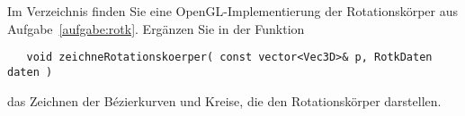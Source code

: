 %
Im Verzeichnis  finden Sie eine 
OpenGL-Implementierung der Rotationskörper 
aus Aufgabe~\ref{aufgabe:rotk}. Ergänzen Sie in der Funktion
\begin{verbatim}
   void zeichneRotationskoerper( const vector<Vec3D>& p, RotkDaten daten )
\end{verbatim}
das Zeichnen der Bézierkurven und Kreise, die den Rotationskörper 
darstellen.
